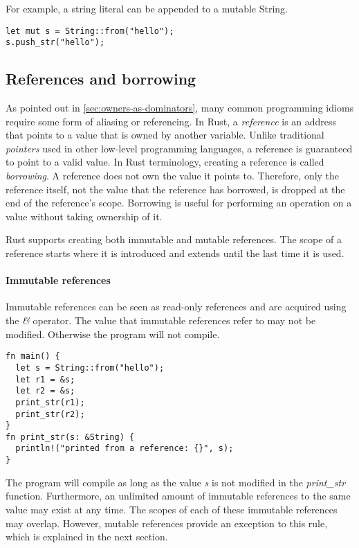 \documentclass[sigplan,11pt,nonacm]{acmart}
\begin{document}
For example, a string literal can be appended to a mutable String.
\begin{lstlisting}
let mut s = String::from("hello");
s.push_str("hello");
\end{lstlisting}


\subsection{References and borrowing}
\label{sec:rust-references}

As pointed out in \ref{sec:owners-as-dominators}, many common programming idioms require some form of aliasing or referencing.
In Rust, a \emph{reference} is an address that points to a value that is owned by another variable.
Unlike traditional \emph{pointers} used in other low-level programming languages, a reference is guaranteed to point to a valid value.
In Rust terminology, creating a reference is called \emph{borrowing}.
A reference does not own the value it points to.
Therefore, only the reference itself, not the value that the reference has borrowed, is dropped at the end of the reference's scope.
Borrowing is useful for performing an operation on a value without taking ownership of it.

Rust supports creating both immutable and mutable references.
The scope of a reference starts where it is introduced and extends until the last time it is used.

\paragraph{Immutable references}

Immutable references can be seen as read-only references and are acquired using the \emph{\&} operator.
The value that immutable references refer to may not be modified.
Otherwise the program will not compile.

\begin{lstlisting}
fn main() {
  let s = String::from("hello");
  let r1 = &s;
  let r2 = &s;
  print_str(r1);
  print_str(r2);
}
fn print_str(s: &String) {
  println!("printed from a reference: {}", s);
}
\end{lstlisting}

The program will compile as long as the value \emph{s} is not modified in the \emph{print\_str} function.
Furthermore, an unlimited amount of immutable references to the same value may exist at any time.
The scopes of each of these immutable references may overlap.
However, mutable references provide an exception to this rule, which is explained in the next section.
\end{document}
